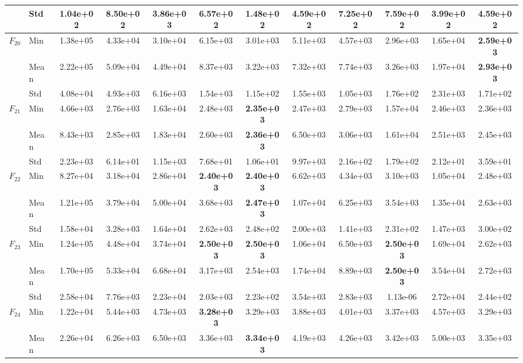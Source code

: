 \begin{center}
\begin{longtable}{clcccccccccc}
 & Std & 1.04e+02 & 8.50e+02 & 3.86e+03 & 6.57e+02 & 1.48e+02 & 4.59e+02 & 7.25e+02 & 7.59e+02 & 3.99e+02 & 4.59e+02 \\
\midrule
\multirow{3}{*}{$F_{20}$} & Min & 1.38e+05 & 4.33e+04 & 3.10e+04 & 6.15e+03 & 3.01e+03 & 5.11e+03 & 4.57e+03 & 2.96e+03 & 1.65e+04 & \textbf{2.59e+03} \\
 & Mean & 2.22e+05 & 5.09e+04 & 4.49e+04 & 8.37e+03 & 3.22e+03 & 7.32e+03 & 7.74e+03 & 3.26e+03 & 1.97e+04 & \textbf{2.93e+03} \\
 & Std & 4.08e+04 & 4.93e+03 & 6.16e+03 & 1.54e+03 & 1.15e+02 & 1.55e+03 & 1.05e+03 & 1.76e+02 & 2.31e+03 & 1.71e+02 \\
\midrule
\multirow{3}{*}{$F_{21}$} & Min & 4.66e+03 & 2.76e+03 & 1.63e+04 & 2.48e+03 & \textbf{2.35e+03} & 2.47e+03 & 2.79e+03 & 1.57e+04 & 2.46e+03 & 2.36e+03 \\
 & Mean & 8.43e+03 & 2.85e+03 & 1.83e+04 & 2.60e+03 & \textbf{2.36e+03} & 6.50e+03 & 3.06e+03 & 1.61e+04 & 2.51e+03 & 2.45e+03 \\
 & Std & 2.23e+03 & 6.14e+01 & 1.15e+03 & 7.68e+01 & 1.06e+01 & 9.97e+03 & 2.16e+02 & 1.79e+02 & 2.12e+01 & 3.59e+01 \\
\midrule
\multirow{3}{*}{$F_{22}$} & Min & 8.27e+04 & 3.18e+04 & 2.86e+04 & \textbf{2.40e+03} & \textbf{2.40e+03} & 6.62e+03 & 4.34e+03 & 3.10e+03 & 1.05e+04 & 2.48e+03 \\
 & Mean & 1.21e+05 & 3.79e+04 & 5.00e+04 & 3.68e+03 & \textbf{2.47e+03} & 1.07e+04 & 6.25e+03 & 3.54e+03 & 1.35e+04 & 2.63e+03 \\
 & Std & 1.58e+04 & 3.28e+03 & 1.64e+04 & 2.62e+03 & 2.48e+02 & 2.00e+03 & 1.41e+03 & 2.31e+02 & 1.47e+03 & 3.00e+02 \\
\midrule
\multirow{3}{*}{$F_{23}$} & Min & 1.24e+05 & 4.48e+04 & 3.74e+04 & \textbf{2.50e+03} & \textbf{2.50e+03} & 1.06e+04 & 6.50e+03 & \textbf{2.50e+03} & 1.69e+04 & 2.62e+03 \\
 & Mean & 1.70e+05 & 5.33e+04 & 6.68e+04 & 3.17e+03 & 2.54e+03 & 1.74e+04 & 8.89e+03 & \textbf{2.50e+03} & 3.54e+04 & 2.72e+03 \\
 & Std & 2.58e+04 & 7.76e+03 & 2.23e+04 & 2.03e+03 & 2.23e+02 & 3.54e+03 & 2.83e+03 & 1.13e-06 & 2.72e+04 & 2.44e+02 \\
\midrule
\multirow{3}{*}{$F_{24}$} & Min & 1.22e+04 & 5.44e+03 & 4.73e+03 & \textbf{3.28e+03} & 3.29e+03 & 3.88e+03 & 4.01e+03 & 3.37e+03 & 4.57e+03 & 3.29e+03 \\
 & Mean & 2.26e+04 & 6.26e+03 & 6.50e+03 & 3.36e+03 & \textbf{3.34e+03} & 4.19e+03 & 4.26e+03 & 3.42e+03 & 5.00e+03 & 3.35e+03 \\

\end{longtable}
\end{center}
